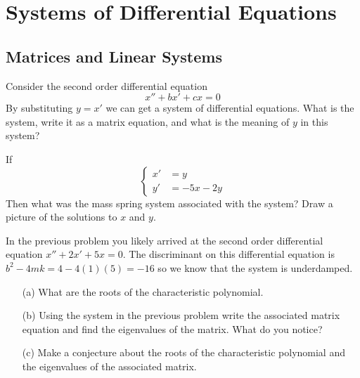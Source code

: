 \chapter{Systems of Differential Equations}

\section{Matrices and Linear Systems}
\begin{problem}
   Consider the second order differential equation 
    \[ x'' + bx' + c x = 0 \]
    By substituting $y = x'$ we can get a system of differential equations.  What is the
    system, write it as a matrix equation, and what is the meaning of $y$ in this system? 
\end{problem}



\begin{problem}   
    If 
    \[ \left\{ \begin{array}{cl} x' &= y \\ y' &= -5x-2y \end{array} \right. \]
    Then what was the mass spring system associated with the system?  Draw a picture of
    the solutions to $x$ and $y$.
\end{problem}

\begin{problem}
    In the previous problem you likely arrived at the second order differential equation
    $x'' + 2x' + 5x = 0$.  The discriminant on this differential equation is
    $b^2-4mk=4-4(1)(5)=-16$ so we know that the system is underdamped.  
    \begin{enumerate}
        \item[(a)] What are the roots of the characteristic polynomial.
        \item[(b)] Using the system in the previous problem write the associated matrix
            equation and find the eigenvalues of the matrix.  What do you notice?
        \item[(c)] Make a conjecture about the roots of the characteristic polynomial and
            the eigenvalues of the associated matrix.
    \end{enumerate}
\end{problem}

